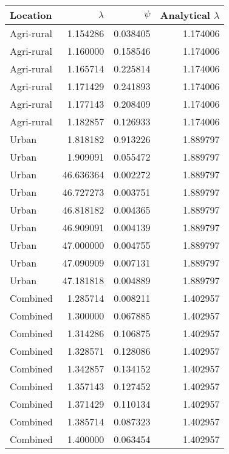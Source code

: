 \begin{tabular}{lrrr}
\toprule
   Location &  $\lambda$ &    $\psi$ &  Analytical $\lambda$ \\
\midrule
 Agri-rural &   1.154286 &  0.038405 &              1.174006 \\
 Agri-rural &   1.160000 &  0.158546 &              1.174006 \\
 Agri-rural &   1.165714 &  0.225814 &              1.174006 \\
 Agri-rural &   1.171429 &  0.241893 &              1.174006 \\
 Agri-rural &   1.177143 &  0.208409 &              1.174006 \\
 Agri-rural &   1.182857 &  0.126933 &              1.174006 \\
      Urban &   1.818182 &  0.913226 &              1.889797 \\
      Urban &   1.909091 &  0.055472 &              1.889797 \\
      Urban &  46.636364 &  0.002272 &              1.889797 \\
      Urban &  46.727273 &  0.003751 &              1.889797 \\
      Urban &  46.818182 &  0.004365 &              1.889797 \\
      Urban &  46.909091 &  0.004139 &              1.889797 \\
      Urban &  47.000000 &  0.004755 &              1.889797 \\
      Urban &  47.090909 &  0.007131 &              1.889797 \\
      Urban &  47.181818 &  0.004889 &              1.889797 \\
   Combined &   1.285714 &  0.008211 &              1.402957 \\
   Combined &   1.300000 &  0.067885 &              1.402957 \\
   Combined &   1.314286 &  0.106875 &              1.402957 \\
   Combined &   1.328571 &  0.128086 &              1.402957 \\
   Combined &   1.342857 &  0.134152 &              1.402957 \\
   Combined &   1.357143 &  0.127452 &              1.402957 \\
   Combined &   1.371429 &  0.110134 &              1.402957 \\
   Combined &   1.385714 &  0.087323 &              1.402957 \\
   Combined &   1.400000 &  0.063454 &              1.402957 \\

\end{tabular}
